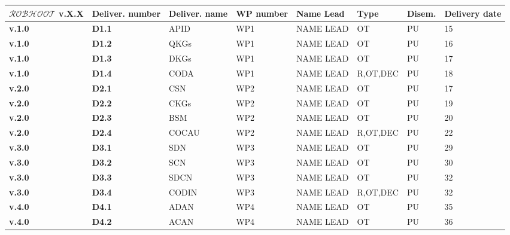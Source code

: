 \documentclass[11pt, a4paper]{article} %
\begin{document}
\begin{table}[h!]
\begin{center}
  \begin{tabular}{|m{2cm} || m{1.25cm} || m{1.75cm} || m{1.5cm} || m{2.4cm} || m{1.7cm} || m{1.15cm} || m{1.7cm}|}
  \hline\hline
  \rowcolor{lightpink!30}
  {\bf $\mathcal{ROBHOOT}$ v.X.X} & {\bf Deliver. number} & {\bf Deliver. name} & {\bf WP number} & {\bf Name Lead} & {\bf Type} & {\bf Disem.} & {\bf Delivery date} \\
  \hline\hline
  \rowcolor{piggypink!20}
  {\bf v.1.0} & {\bf D1.1} & APID & WP1 & NAME LEAD & OT & PU & 15 \\
  \hline\hline
  \rowcolor{piggypink!20}
  {\bf v.1.0} & {\bf D1.2} & QKGs & WP1 & NAME LEAD & OT & PU  & 16 \\
  \hline\hline
   \rowcolor{piggypink!20}
  {\bf v.1.0} & {\bf D1.3} & DKGs & WP1 & NAME LEAD & OT & PU  & 17 \\
  \hline\hline
  \rowcolor{piggypink!20}
  {\bf v.1.0} & {\bf D1.4} & CODA & WP1 & NAME LEAD & R,OT,DEC & PU  & 18 \\
    \hline\hline
 \rowcolor{piggypink!40}
  {\bf v.2.0} & {\bf D2.1} & CSN & WP2 & NAME LEAD & OT & PU & 17 \\
  \hline\hline
  \rowcolor{piggypink!40}
  {\bf v.2.0} & {\bf D2.2} & CKGs & WP2 & NAME LEAD & OT & PU  & 19 \\
  \hline\hline
   \rowcolor{piggypink!40}
  {\bf v.2.0} & {\bf D2.3} & BSM & WP2 & NAME LEAD & OT & PU  & 20 \\
  \hline\hline
  \rowcolor{piggypink!40}
    {\bf v.2.0} & {\bf D2.4} & COCAU & WP2 & NAME LEAD & R,OT,DEC & PU & 22 \\
    \hline\hline
    \rowcolor{piggypink!60}
  {\bf v.3.0} & {\bf D3.1} & SDN & WP3 & NAME LEAD & OT & PU  & 29 \\
  \hline\hline
  \rowcolor{piggypink!60}
  {\bf v.3.0} & {\bf D3.2} & SCN & WP3 & NAME LEAD & OT & PU & 30 \\
  \hline\hline
   \rowcolor{piggypink!60}
  {\bf v.3.0} & {\bf D3.3} & SDCN & WP3 & NAME LEAD & OT & PU & 32 \\
  \hline\hline
  \rowcolor{piggypink!60}
  {\bf v.3.0} & {\bf D3.4} & CODIN & WP3 & NAME LEAD & R,OT,DEC & PU & 32 \\
   \hline\hline
    \rowcolor{piggypink!80}
  {\bf v.4.0} & {\bf D4.1} & ADAN & WP4 & NAME LEAD & OT & PU & 35 \\
  \hline\hline
  \rowcolor{piggypink!80}
  {\bf v.4.0} & {\bf D4.2} & ACAN & WP4 & NAME LEAD & OT & PU & 36 \\

\end{tabular}
\end{center}
\end{table}
\end{document}
